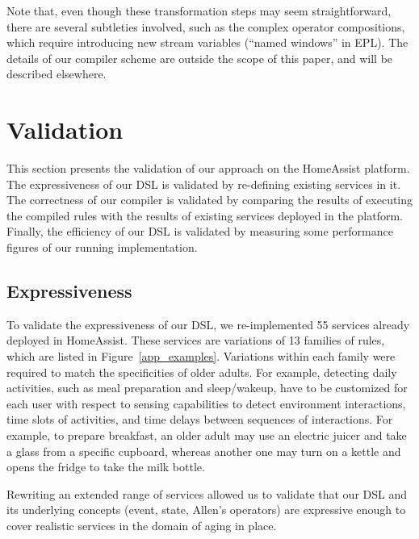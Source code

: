 Note that, even though these transformation steps may seem straightforward, there are several subtleties involved, such as the complex operator compositions, which require introducing new stream variables (``named windows'' in EPL). The details of our compiler scheme are outside the scope of this paper, and will be described elsewhere.

\section{Validation}\label{sec:validation}
This section presents the validation of our approach on the HomeAssist platform.  The expressiveness of our DSL is validated by re-defining existing services in it. The correctness of our compiler is validated by comparing the results of executing the compiled rules with the results of existing services deployed in the platform. Finally, the efficiency of our DSL is validated by measuring some performance figures of our running implementation.



\subsection{Expressiveness}\label{validation:expressiveness}
To validate the expressiveness of our DSL, we re-implemented 55 services already deployed in HomeAssist. These services are variations of 13 families of rules, which are listed in Figure~\ref{app_examples}. Variations within each family were required to match the specificities of older adults. For example, detecting daily activities, such as meal preparation and sleep/wa\-keup, have to be customized for each user with respect to sensing capabilities to detect environment interactions, time slots of activities, and time delays between sequences of interactions. For example, to prepare breakfast, an older adult may use an electric juicer and take a glass from a specific cupboard, whereas another one may turn on a kettle and opens the fridge to take the milk bottle.

Rewriting an extended range of services allowed us to validate that our DSL and its underlying concepts (event, state, Allen's operators) are expressive enough to cover realistic services in the domain of aging in place.


